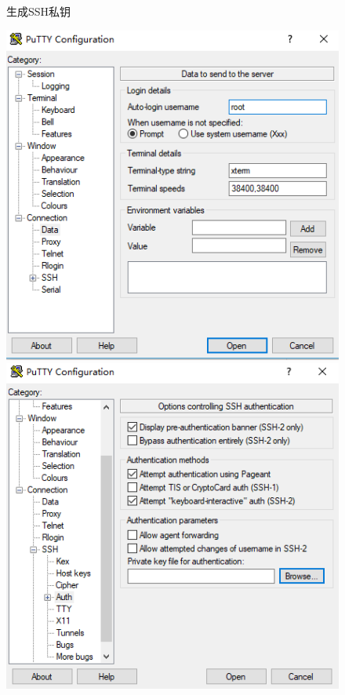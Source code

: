 \documentclass[a4paper,11pt]{ctexart}
\begin{document}
\begin{spacing}{1.5}
\begin{figure}[h]
	\caption{生成SSH私钥}\label{figure:PUTTY1}
\end{figure}
\begin{figure}[h]
	\centering
	\setlength{\abovecaptionskip}{2mm}
	\setlength{\belowcaptionskip}{-2mm}
	\includegraphics[scale=0.3]{PUTTY2.png}
	\includegraphics[scale=0.3]{PUTTY3.png}

\end{figure}
\end{spacing}
\end{document}
